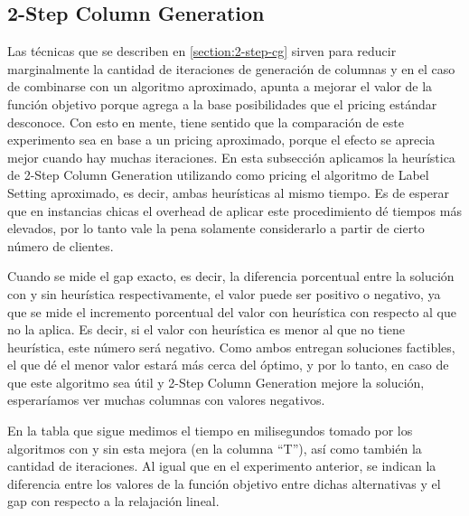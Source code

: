 \subsection{2-Step Column Generation}
\label{section:2-step-cg-testing}

Las técnicas que se describen en \ref{section:2-step-cg} sirven para reducir marginalmente la cantidad de iteraciones de generación de columnas y en el caso de combinarse con un algoritmo aproximado, apunta a mejorar el valor de la función objetivo porque agrega a la base posibilidades que el pricing estándar desconoce. Con esto en mente, tiene sentido que la comparación de este experimento sea en base a un pricing aproximado, porque el efecto se aprecia mejor cuando hay muchas iteraciones. En esta subsección aplicamos la heurística de 2-Step Column Generation utilizando como pricing el algoritmo de Label Setting aproximado, es decir, ambas heurísticas al mismo tiempo. Es de esperar que en instancias chicas el overhead de aplicar este procedimiento dé tiempos más elevados, por lo tanto vale la pena solamente considerarlo a partir de cierto número de clientes. 

Cuando se mide el gap exacto, es decir, la diferencia porcentual entre la solución con y sin heurística respectivamente, el valor puede ser positivo o negativo, ya que se mide el incremento porcentual del valor con heurística con respecto al que no la aplica. Es decir, si el valor con heurística es menor al que no tiene heurística, este número será negativo. Como ambos entregan soluciones factibles, el que dé el menor valor estará más cerca del óptimo, y por lo tanto, en caso de que este algoritmo sea útil y 2-Step Column Generation mejore la solución, esperaríamos ver muchas columnas con valores negativos.

En la tabla que sigue medimos el tiempo en milisegundos tomado por los algoritmos con y sin esta mejora (en la columna ``T''), así como también la cantidad de iteraciones. Al igual que en el experimento anterior, se indican la diferencia entre los valores de la función objetivo entre dichas alternativas y el gap con respecto a la relajación lineal. 


